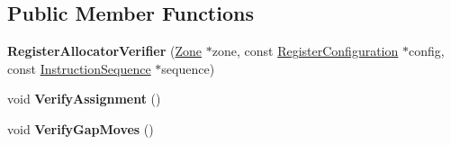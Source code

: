 \subsection*{Public Member Functions}
\begin{DoxyCompactItemize}
\item 
{\bfseries Register\+Allocator\+Verifier} (\hyperlink{classv8_1_1internal_1_1_zone}{Zone} $\ast$zone, const \hyperlink{classv8_1_1internal_1_1_register_configuration}{Register\+Configuration} $\ast$config, const \hyperlink{classv8_1_1internal_1_1compiler_1_1_instruction_sequence}{Instruction\+Sequence} $\ast$sequence)\hypertarget{classv8_1_1internal_1_1compiler_1_1_register_allocator_verifier_aef6d8bede5616df7292f7552f785798a}{}\label{classv8_1_1internal_1_1compiler_1_1_register_allocator_verifier_aef6d8bede5616df7292f7552f785798a}

\item 
void {\bfseries Verify\+Assignment} ()\hypertarget{classv8_1_1internal_1_1compiler_1_1_register_allocator_verifier_a3500fd8b38b9129d47993897d4e8a9bc}{}\label{classv8_1_1internal_1_1compiler_1_1_register_allocator_verifier_a3500fd8b38b9129d47993897d4e8a9bc}

\item 
void {\bfseries Verify\+Gap\+Moves} ()\hypertarget{classv8_1_1internal_1_1compiler_1_1_register_allocator_verifier_a3243175f280f32d532c39c297cfb23f9}{}\label{classv8_1_1internal_1_1compiler_1_1_register_allocator_verifier_a3243175f280f32d532c39c297cfb23f9}

\end{DoxyCompactItemize}
